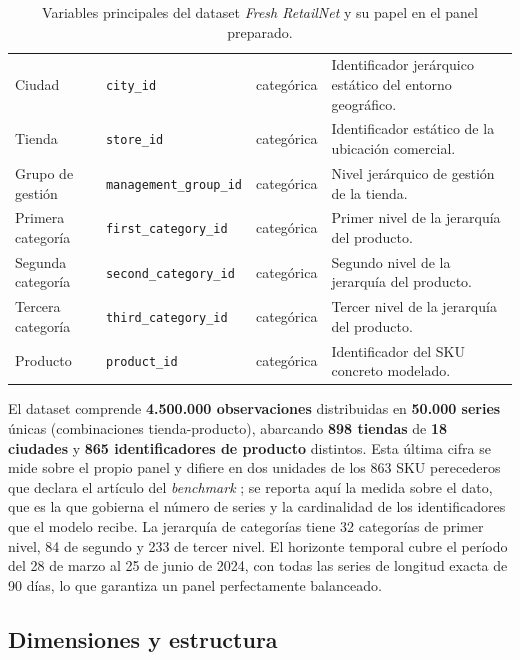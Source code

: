 \begin{table}[htbp]
{\begin{tabular}{>{\raggedright\arraybackslash}p{} >{\raggedright\arraybackslash}p{} >{\raggedright\arraybackslash}p{} >{\raggedright\arraybackslash}p{}}
        Ciudad & \texttt{city\_id} & categórica & Identificador jerárquico estático del entorno geográfico. \\
        Tienda & \texttt{store\_id} & categórica & Identificador estático de la ubicación comercial. \\
        Grupo de gestión & \texttt{management\_\allowbreak{}group\_\allowbreak{}id} & categórica & Nivel jerárquico de gestión de la tienda. \\
        Primera categoría & \texttt{first\_\allowbreak{}category\_\allowbreak{}id} & categórica & Primer nivel de la jerarquía del producto. \\
        Segunda categoría & \texttt{second\_\allowbreak{}category\_\allowbreak{}id} & categórica & Segundo nivel de la jerarquía del producto. \\
        Tercera categoría & \texttt{third\_\allowbreak{}category\_\allowbreak{}id} & categórica & Tercer nivel de la jerarquía del producto. \\
        Producto & \texttt{product\_id} & categórica & Identificador del SKU concreto modelado. \\
        \bottomrule
    \end{tabular}
    }%
    \caption{Variables principales del dataset \textit{Fresh Retail\-Net} y su papel en el panel preparado.}
    \label{tab:dataset_variables}
\end{table}

El dataset comprende \textbf{4.500.000 observaciones} distribuidas en \textbf{50.000 series} únicas (combinaciones tienda-producto), abarcando \textbf{898 tiendas} de \textbf{18 ciudades} y \textbf{865 identificadores de producto} distintos. Esta última cifra se mide sobre el propio panel y difiere en dos unidades de los 863 SKU perecederos que declara el artículo del \textit{benchmark} \cite{freshretailnet2025}; se reporta aquí la medida sobre el dato, que es la que gobierna el número de series y la cardinalidad de los identificadores que el modelo recibe. La jerarquía de categorías tiene 32 categorías de primer nivel, 84 de segundo y 233 de tercer nivel. El horizonte temporal cubre el período del 28 de marzo al 25 de junio de 2024, con todas las series de longitud exacta de 90 días, lo que garantiza un panel perfectamente balanceado.

\subsection{Dimensiones y estructura}

